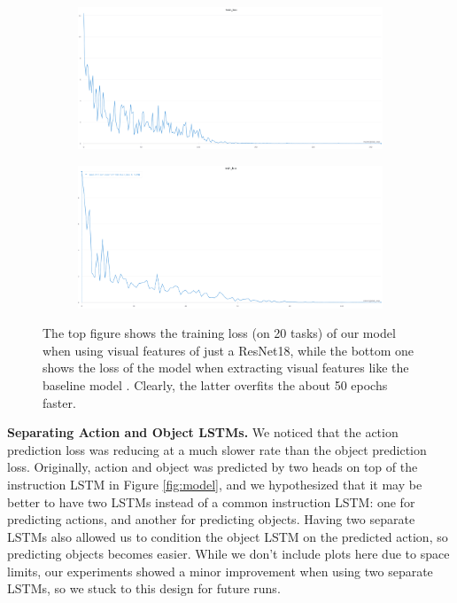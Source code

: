 \documentclass[11pt,a4paper]{article}
\begin{document}
\begin{figure}
    \centering
    \begin{subfigure}[b]{0.5\textwidth}
    \centering
    \includegraphics[scale=0.2]{figures/adam_loss.png}
    \caption{}
    \end{subfigure}
    \hfill
    \begin{subfigure}[b]{0.5\textwidth}
    \centering
    \includegraphics[scale=0.2]{figures/baseline_vision_loss.png}
    \caption{}
    \end{subfigure}
    \caption{The top figure shows the training loss (on 20 tasks) of our model when using visual features of just a ResNet18, while the bottom one shows the loss of the model when extracting visual features like the baseline model \cite{shridhar2020alfred}. Clearly, the latter overfits the about 50 epochs faster.}
    \label{fig:baseline-vision}
\end{figure}

\textbf{Separating Action and Object LSTMs.} We noticed that the action prediction loss was reducing at a much slower rate than the object prediction loss. Originally, action and object was predicted by two heads on top of the instruction LSTM in Figure \ref{fig:model}, and we hypothesized that it may be better to have two LSTMs instead of a common instruction LSTM: one for predicting actions, and another for predicting objects. Having two separate LSTMs also allowed us to condition the object LSTM on the predicted action, so predicting objects becomes easier. While we don't include plots here due to space limits, our experiments showed a minor improvement when using two separate LSTMs, so we stuck to this design for future runs.
\end{document}
